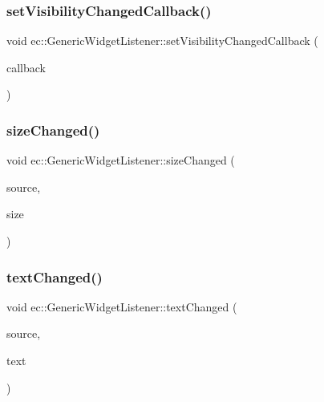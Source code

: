 \subsubsection{\texorpdfstring{set\+Visibility\+Changed\+Callback()}{setVisibilityChangedCallback()}}
{\footnotesize\ttfamily void ec\+::\+Generic\+Widget\+Listener\+::set\+Visibility\+Changed\+Callback (\begin{DoxyParamCaption}\item[{const \mbox{\hyperlink{classec_1_1_generic_widget_listener_aff589de061ea44ef90ab0fb63ad92477}{Visibility\+Changed\+\_\+\+Callback}} \&}]{callback }\end{DoxyParamCaption})}

\mbox{\label{classec_1_1_generic_widget_listener_a8566ffeb05ef271dc60c7b5215efca21}} 
\subsubsection{\texorpdfstring{size\+Changed()}{sizeChanged()}}
{\footnotesize\ttfamily void ec\+::\+Generic\+Widget\+Listener\+::size\+Changed (\begin{DoxyParamCaption}\item[{agui\+::\+Widget $\ast$}]{source,  }\item[{const agui\+::\+Dimension \&}]{size }\end{DoxyParamCaption})\hspace{0.3cm}{\ttfamily [override]}}

\mbox{\label{classec_1_1_generic_widget_listener_a9be71b4dbb023b6e247427326e73b760}} 
\subsubsection{\texorpdfstring{text\+Changed()}{textChanged()}}
{\footnotesize\ttfamily void ec\+::\+Generic\+Widget\+Listener\+::text\+Changed (\begin{DoxyParamCaption}\item[{agui\+::\+Widget $\ast$}]{source,  }\item[{const std\+::string \&}]{text }\end{DoxyParamCaption})\hspace{0.3cm}{\ttfamily [override]}}

